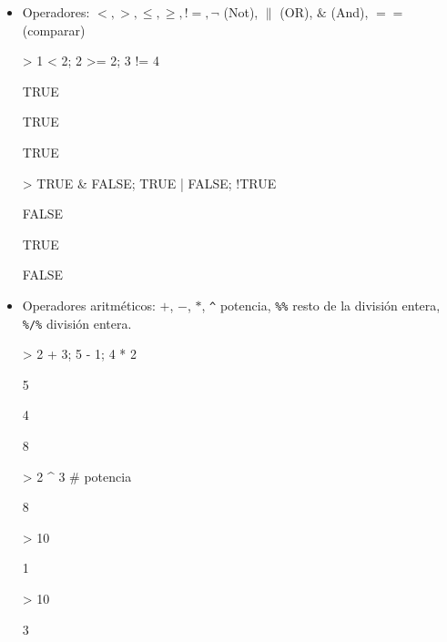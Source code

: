 \documentclass[12pt]{article}
\begin{document}
\begin{itemize}
\item Operadores: $<,>,\le,\ge,!=, \lnot$ (Not),  $\|$ (OR), $\&$ (And),  $==$ (comparar)

\begin{Schunk}
\begin{Sinput}
> 1 < 2; 2 >= 2; 3 != 4
\end{Sinput}
\begin{Soutput}
[1] TRUE
\end{Soutput}
\begin{Soutput}
[1] TRUE
\end{Soutput}
\begin{Soutput}
[1] TRUE
\end{Soutput}
\begin{Sinput}
> TRUE & FALSE; TRUE | FALSE; !TRUE
\end{Sinput}
\begin{Soutput}
[1] FALSE
\end{Soutput}
\begin{Soutput}
[1] TRUE
\end{Soutput}
\begin{Soutput}
[1] FALSE
\end{Soutput}
\end{Schunk}

\item Operadores aritméticos: $+$, $-$, $*$, \verb|^| potencia,  \verb|%%| resto de la división entera,  \verb|%/%| división entera.

\begin{Schunk}
\begin{Sinput}
> 2 + 3; 5 - 1; 4 * 2
\end{Sinput}
\begin{Soutput}
[1] 5
\end{Soutput}
\begin{Soutput}
[1] 4
\end{Soutput}
\begin{Soutput}
[1] 8
\end{Soutput}
\begin{Sinput}
> 2 ^ 3        # potencia
\end{Sinput}
\begin{Soutput}
[1] 8
\end{Soutput}
\begin{Sinput}
> 10 %
\end{Sinput}
\begin{Soutput}
[1] 1
\end{Soutput}
\begin{Sinput}
> 10 %
\end{Sinput}
\begin{Soutput}
[1] 3
\end{Soutput}
\end{Schunk}


\end{itemize}
\end{document}

